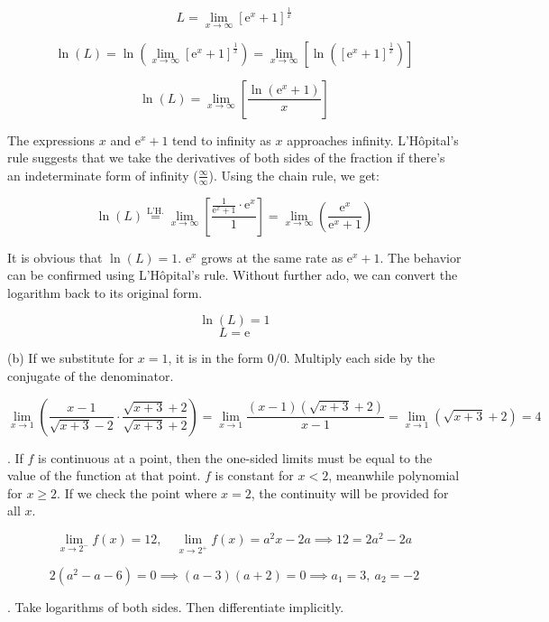 \documentclass{article}
\begin{document}
\[ L = \lim_{x \to \infty} [\mathrm{e}^x + 1]^{\frac{1}{x}} \]

\[
\ln(L) = \ln\left(\lim_{x \to \infty} [\mathrm{e}^x + 1]^{\frac{1}{x}}\right) = \lim_{x \to \infty} \left[ \ln\left( [\mathrm{e}^x + 1]^{\frac{1}{x}} \right) \right]
\]

\[
\ln(L) = \lim_{x \to \infty} \left[ \frac{\ln(\mathrm{e}^x + 1)}{x}\right]
\]

\hfill

\noindent The expressions $x$ and $\mathrm{e}^x + 1$ tend to infinity as $x$ approaches infinity. L'Hôpital's rule suggests that we take the derivatives of both sides of the fraction if there's an indeterminate form of infinity ($\frac{\infty}{\infty}$). Using the chain rule, we get:

\[\ln(L) \overset{\text{L'H.}}{=} \lim_{x \to \infty} \left[ \frac{\frac{1}{\mathrm{e}^x+1} \cdot \mathrm{e}^x}{1}\right] = \lim_{x \to \infty} \left( \frac{\mathrm{e}^x}{\mathrm{e}^x+1} \right)\]

\hfill

\noindent It is obvious that $\ln(L) = 1$. $\mathrm{e}^x$ grows at the same rate as $\mathrm{e}^x + 1$. The behavior can be confirmed using L'Hôpital's rule. Without further ado, we can convert the logarithm back to its original form.

\[\ln(L) = 1\]
\[\boxed{L = \mathrm{e}}\]

\hfill

\noindent (b) If we substitute for $x = 1$, it is in the form $0/0$. Multiply each side by the conjugate of the denominator.

\[
\lim_{x \to 1}\left( \frac{x-1}{\sqrt{x+3} - 2} \cdot \frac{\sqrt{x+3} + 2}{\sqrt{x+3} + 2} \right) = \lim_{x \to 1} \frac{(x-1)(\sqrt{x+3} + 2)}{x-1} = \lim_{x \to 1} (\sqrt{x+3} + 2) = \boxed 4\]

\hfill

. If $f$ is continuous at a point, then the one-sided limits must be equal to the value of the function at that point. $f$ is constant for $x < 2$, meanwhile polynomial for $x \geq 2$. If we check the point where $x=2$, the continuity will be provided for all $x$.

\[\lim_{x\to2^-}f(x)=12,\quad\lim_{x\to2^+}f(x)=a^2x-2a\implies12=2a^2-2a\]

\[2(a^2-a-6)=0\implies(a-3)(a+2)=0\implies\boxed{a_1=3,\:a_2=-2}\]

\hfill

. Take logarithms of both sides. Then differentiate implicitly.
\end{document}
